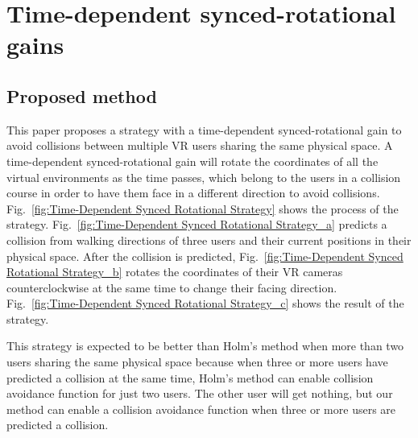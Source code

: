 \chapter{Time-dependent synced-rotational gains} %

\label{Chapter3} %
\section{Proposed method}
This paper proposes a strategy with a time-dependent synced-rotational gain to avoid collisions between multiple VR users sharing the same physical space. A time-dependent synced-rotational gain will rotate the coordinates of all the virtual environments as the time passes, which belong to the users in a collision course in order to have them face in a different direction to avoid collisions. Fig.~\ref{fig:Time-Dependent Synced Rotational Strategy} shows the process of the strategy. Fig.~\ref{fig:Time-Dependent Synced Rotational Strategy_a} predicts a collision from walking directions of three users and their current positions in their physical space. After the collision is predicted, Fig.~\ref{fig:Time-Dependent Synced Rotational Strategy_b} rotates the coordinates of their VR cameras counterclockwise
at the same time to change their facing direction. Fig.~\ref{fig:Time-Dependent Synced Rotational Strategy_c} shows the result of the strategy.

This strategy is expected to be better than Holm's method when more than two users sharing the same physical space because when three or more users have predicted a collision at the same time, Holm's method can enable collision avoidance function for just two users. The other user will get nothing, but our method can enable a collision avoidance function when three or more users are predicted a collision.

